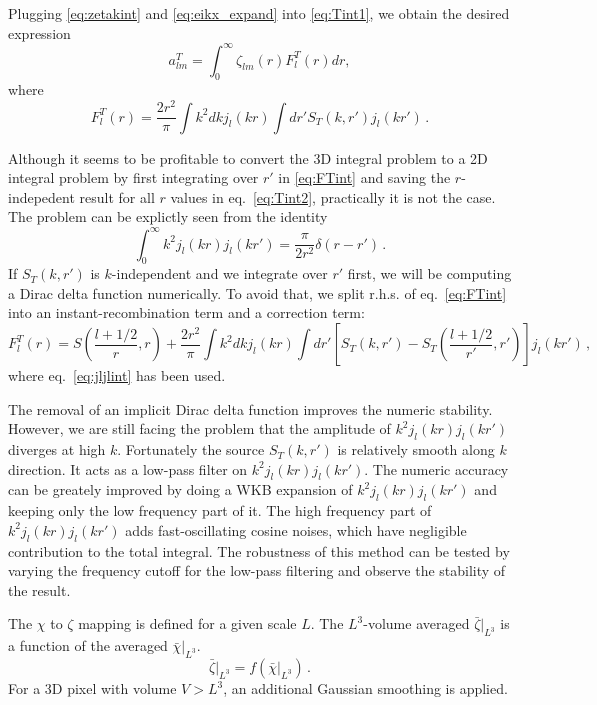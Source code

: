 Plugging \eqref{eq:zetakint} and \eqref{eq:eikx_expand} into \eqref{eq:Tint1}, we obtain the desired expression
\begin{equation}
a_{lm}^T = \int_0^\infty \zeta_{lm}(r) F^T_l(r) dr, \label{eq:Tint2}
\end{equation}
where
\begin{equation}
F^T_l(r) = \frac{2r^2}{\pi} \int k^2dk j_l(kr) \int dr' S_T(k, r') j_l(kr') \, . \label{eq:FTint}
\end{equation}

Although it seems to be profitable to convert the 3D integral problem to a 2D integral problem by first integrating over $r'$ in \eqref{eq:FTint} and saving the $r$-indepedent result for all $r$ values in eq.~\eqref{eq:Tint2}, practically it is not the case. The problem can be explictly seen from the identity
\begin{equation}
\int_0^\infty k^2 j_l(kr) j_l(kr') = \frac{\pi}{2r^2}\delta(r - r') \,. \label{eq:jljlint}
\end{equation}
If $S_T(k, r')$ is $k$-independent and we integrate over $r'$ first, we will be computing a Dirac delta function numerically. To avoid that, we split r.h.s. of eq.~\eqref{eq:FTint} into an instant-recombination term and a correction term:
\begin{equation}
F^T_l(r) =  S\left(\frac{l+1/2}{r}, r\right) + \frac{2r^2}{\pi} \int k^2dk j_l(kr) \int dr' \left[S_T(k, r')- S_T\left(\frac{l+1/2}{r'}, r'\right)\right] j_l(kr') \, , \label{eq:FTint2}
\end{equation}
where eq.~\eqref{eq:jljlint} has been used.

The removal of an implicit Dirac delta function improves the numeric stability. However, we are still facing the problem that the amplitude of $k^2 j_l(kr) j_l(kr')$ diverges at high $k$. Fortunately the source $S_T(k, r')$ is relatively smooth along $k$ direction. It acts as a low-pass filter on $k^2j_l(kr)j_l(kr')$. The numeric accuracy can be greately improved by doing a WKB expansion of $k^2j_l(kr)j_l(kr')$ and keeping only the low frequency part of it. The high frequency part of $k^2j_l(kr)j_l(kr')$ adds fast-oscillating cosine noises, which have negligible contribution to the total integral. The robustness of this method can be tested by varying the frequency cutoff for the low-pass filtering and observe the stability of the result.

The $\chi$ to $\zeta$ mapping is defined for a given scale $L$. The $L^3$-volume averaged $\bar{\zeta}|_{L^3}$ is a function of the averaged $\bar{\chi}|_{L^3}$.
\begin{equation}
\bar{\zeta}\vert_{L^3}  = f\left(\bar{\chi}\vert_{L^3}\right)\, .
\end{equation}
For a 3D pixel with volume $V > L^3$, an additional Gaussian smoothing is applied.

